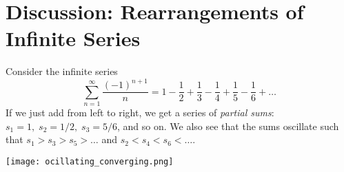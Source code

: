\section{Discussion: Rearrangements of Infinite Series}
    Consider the infinite series
    \begin{equation*}
        \sum_{n=1}^\infty\frac{(-1)^{n+1}}{n} = 1 - \frac{1}{2} + \frac{1}{3} - \frac{1}{4} + \frac{1}{5} - \frac{1}{6} + \dots 
    \end{equation*}
    If we just add from left to right, we get a series of \textit{partial sums}: $s_1 = 1,\; s_2 = 1/2,\; s_3 = 5/6$, and so on. We also see that the sums oscillate such that $s_1 > s_3 > s_5 > \dots$ and $s_2 < s_4 < s_6 < \dots$.
    \begin{center}
        \texttt{[image: ocillating\_converging.png]}
    \end{center}
    
    